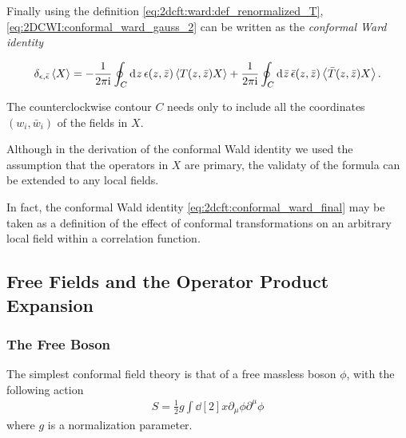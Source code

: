 \documentclass[10pt]{article}
\newcommand{\ii}{\mathrm{i}}
\newenvironment{boxmath}[1]{\begin{tcolorbox}[enhanced,attach boxed title to top center={yshift=-\tcboxedtitleheight/2},boxrule=1pt,title={\centering #1},colframe=NavyBlue!70!black,colback=NavyBlue!10,colbacktitle=NavyBlue!10,fonttitle=\scshape,coltitle=Black]}{\end{tcolorbox}}
\begin{document}
Finally using the definition \cref{eq:2dcft:ward:def_renormalized_T}, \cref{eq:2DCWI:conformal_ward_gauss_2} can be written as the \textit{conformal Ward identity}
\begin{boxmath}{Conformal Ward Identity}
    \begin{align}
        \delta_{\epsilon,\bar{\epsilon}}\expval{X}=-\frac{1}{2\pi\ii}\oint_C\dd[]{z}\epsilon(z,\bar{z})\expval{T(z,\bar{z})X}+\frac{1}{2\pi\ii}\oint_C\dd[]{\bar{z}}\bar{\epsilon}(z,\bar{z})\expval{\bar{T}(z,\bar{z})X}.\label{eq:2dcft:conformal_ward_final}
    \end{align}
\end{boxmath}
The counterclockwise contour $C$ needs only to include all the coordinates $(w_i,\bar{w}_i)$ of the fields in $X$.
\begin{remark}
    Although in the derivation of the conformal Wald identity we used the assumption that the operators in $X$ are primary, the validaty of the formula can be extended to any local fields.

    In fact, the conformal Wald identity \cref{eq:2dcft:conformal_ward_final} may be taken as a definition of the effect of conformal transformations on an arbitrary local field within a correlation function\snm.
\end{remark}

\subsection{Free Fields and the Operator Product Expansion}
\subsubsection{The Free Boson\label{subsubsec:2dcft:FFOPE:boson}}
The simplest conformal field theory is that of a free massless boson $\phi$, with the following action
\begin{align}
    S=\frac{1}{2}g\int\dd[2]{x}\partial_\mu\phi\partial^\mu\phi
\end{align}
where $g$ is a normalization parameter.
\end{document}
